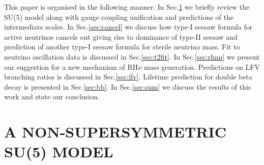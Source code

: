 \documentclass[a4paper,11pt]{article}
\begin{document}
This paper is organised in the following manner.
In Sec.\ref{sec:model} we briefly review the SU(5) model along with gauge coupling
unification and predictions of the intermediate scales. In Sec.\ref{sec:cancel} we
discuss how type-I seesaw formula for active neutrinos cancels out giving rise to dominance of
type-II seesaw and prediction of another type-I seesaw formula for sterile neutrino mass.
Fit to neutrino oscillation data is discussed in Sec.\ref{sec:t2fit}.
 In Sec.\ref{sec:rhnu} we present our suggestion for a new mechanism of RH$\nu$ mass generation. Predictions on
 LFV branching ratios is discussed in Sec.\ref{sec:lfv}.
Lifetime prediction for double beta decay is presented in Sec.\ref{sec:bb}.
In Sec.\ref{sec:sum}
we discuss the results of this work and state our conclusion.
 
\section{\bf A NON-SUPERSYMMETRIC SU(5) MODEL}\label{sec:model}
\end{document}
